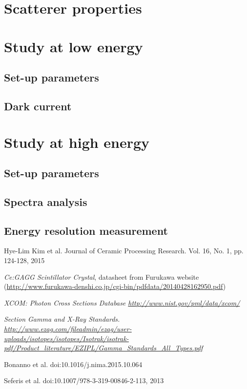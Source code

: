 \documentclass[10pt,a4paper, openany]{book}
\begin{document}
\section{Scatterer properties}

\section{Study at low energy}
\subsection{Set-up parameters}
\subsection{Dark current}

\section{Study at high energy}
\subsection{Set-up parameters}
\subsection{Spectra analysis}
\subsection{Energy resolution measurement}


\clearpage
{}
\begin{thebibliography}{20}

Hye-Lim Kim et al. Journal of Ceramic Processing Research. Vol. 16, No. 1, pp. 124-128, 2015

\emph{Ce:GAGG Scintillator Crystal}, datasheet from Furukawa website (\url{http://www.furukawa-denshi.co.jp/cgi-bin/pdfdata/20140428162950.pdf})

\emph{XCOM: Photon Cross Sections Database \url{http://www.nist.gov/pml/data/xcom/}}

\emph{Section Gamma and X-Ray Standards. \url{http://www.ezag.com/fileadmin/ezag/user-uploads/isotopes/isotopes/Isotrak/isotrak-pdf/Product_literature/EZIPL/Gamma_Standards_All_Types.pdf}}

Bonanno et al. doi:10.1016/j.nima.2015.10.064

Seferis et al. doi:10.1007/978-3-319-00846-2-113, 2013


\end{thebibliography}
\end{document}
